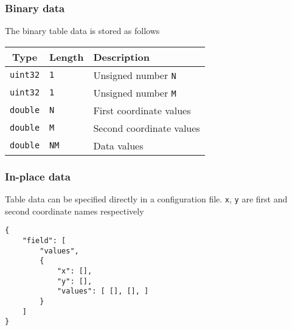\documentclass[12pt]{extarticle}
\newcommand{\code}[1]{\colorbox{gray!10}{\texttt{#1}}}
\begin{document}
            \subsubsection{Binary data}
                \par The binary table data is stored as follows
                \begin{table}[h]
                    \centering
                    \begin{tabular}{|c|l|l|}
                        \hline
                        \textbf{Type} & \multicolumn{1}{l|}{\textbf{Length}} & \textbf{Description}\\
                        \hline
                        \code{uint32} & \code{1} & Unsigned number \code{N}\\
                        \hline
                        \code{uint32} & \code{1} & Unsigned number \code{M}\\
                        \hline
                        \code{double} & \code{N} & First coordinate values\\
                        \hline
                        \code{double} & \code{M} & Second coordinate values\\
                        \hline
                        \code{double} & \code{NM} & Data values\\
                        \hline
                    \end{tabular}
                \end{table}
            \newpage
            \subsubsection{\label{sec:in-place}In-place data}
                \par Table data can be specified directly in a configuration file. \code{x}, \code{y} are first and second coordinate names respectively 
                \begin{verbatim}
{
    "field": [
        "values",
        {
            "x": [],
            "y": [],
            "values": [ [], [], ]
        }
    ]
}
                \end{verbatim}
\end{document}
